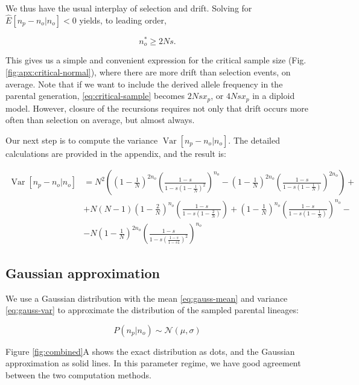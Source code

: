 \documentclass[review]{elsarticle}
\begin{document}
We thus have the usual interplay of selection and drift. Solving for $ \hat{E}[n_p -n_o | n_o]<0$
yields, to leading order,

\begin{equation}
  \label{eq:critical-sample}
  n_o^* \ge 2Ns.
\end{equation}

This gives us a simple and convenient expression for the critical sample size (Fig.
\ref{fig:apx:critical-normal}), where there are more drift than selection events, on average. Note
that if we want to include the derived allele frequency in the parental generation,
\eqref{eq:critical-sample} becomes $2Nsx_p$, or $4Nsx_p$ in a diploid model. However, closure of
the recursions requires not only that drift occurs more often than selection on average, but almost
always.

Our next step is to compute the variance $\operatorname{Var}[n_p-n_o | n_o].$ The detailed
calculations are provided in the appendix, and the result is:

\newcommand{\vara}[1]{\left(1-\frac{#1}{N}\right)}
\newcommand{\varb}[1]{\left(\frac{1-s}{1-s #1}\right)}

\begin{equation}
  \begin{aligned}
    \operatorname{Var}[n_p-n_o | n_o] &=
    N^2\left( \vara{1}^{2n_o}\varb{\vara{1}^2}^{n_o}-\vara{1}^{2n_o}\varb{\vara{1}}^{2n_o} \right) + \\
    &+ N(N-1)\vara{2}^{n_o}\varb{\vara{2}} + \vara{1}^{n_o}\varb{\vara{1}}^{n_o} - \\
    &- N\vara{1}^{2n_o} \varb{\varb{1}^{2}}^{n_o}
    \label{eq:gauss-var}
  \end{aligned}
\end{equation}

\subsection{Gaussian approximation}

We use a Gaussian distribution with the mean \eqref{eq:gauss-mean} and variance \eqref{eq:gauss-var}
to approximate the distribution of the sampled parental lineages:

\begin{equation}
  P(n_p|n_o) \sim \mathcal{N}(\mu, \sigma)
  \label{eq:gaussian}
\end{equation}

Figure \ref{fig:combined}A shows the exact distribution as dots, and the Gaussian approximation as
solid lines. In this parameter regime, we have good agreement between the two computation methods.
\end{document}

